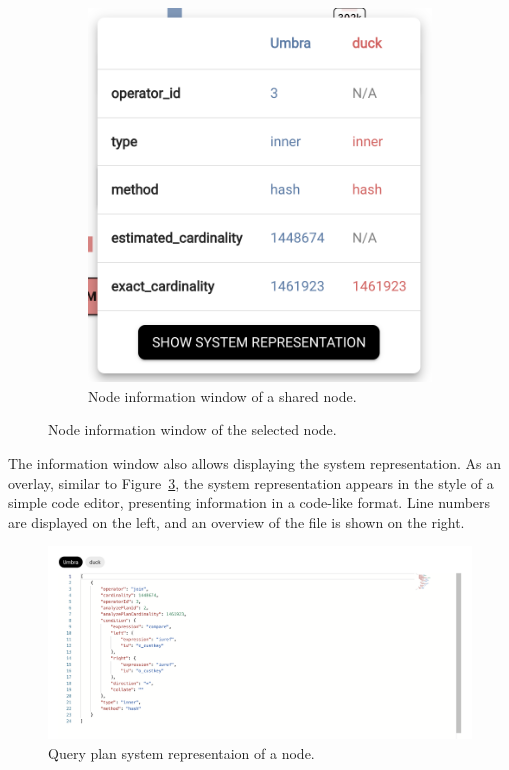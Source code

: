 \begin{figure}[h]
\begin{subfigure}[b]{0.4\linewidth}
      \includegraphics[width=0.9\linewidth]{figures/query-plan-node-info-combined.png}
      \caption{Node information window of a shared node.}
      \label{fig:query-plan-node-info-combined}
  \end{subfigure}
  \caption{Node information window of the selected node.}
  \label{fig:query-plan-node-info}
\end{figure}

The information window also allows displaying the system representation. As an overlay, similar to Figure~\ref{fig:query-plan-system-representation}, the system representation appears in the style of a simple code editor, presenting information in a code-like format. Line numbers are displayed on the left, and an overview of the file is shown on the right.

\begin{figure}[h]
  \centering
  \includegraphics[width=0.8\linewidth]{figures/query-plan-node-system-representation-combined.png}
  \caption{Query plan system representaion of a node.}
  \label{fig:query-plan-system-representation}
\end{figure}

